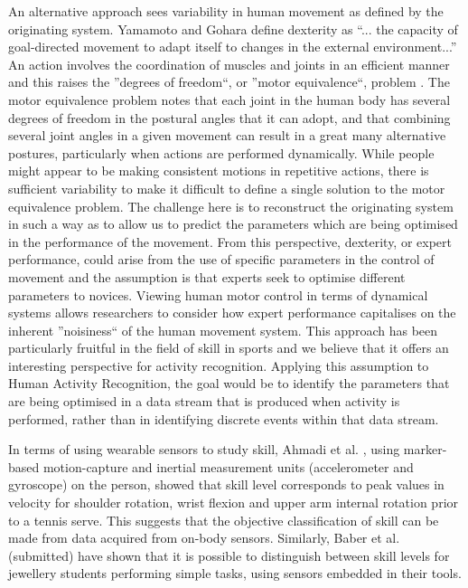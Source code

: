 \documentclass{sigchi}
\begin{document}
An alternative approach sees variability 
in human movement as defined by the originating system. Yamamoto and Gohara \cite{Yamamoto2000} 
define dexterity as ``... the capacity of goal-directed movement to adapt itself to changes in the external 
environment...”  An action involves the coordination of muscles and joints in an efficient manner 
and this raises the ''degrees of freedom``, or ''motor equivalence``, problem \cite{Bernstein1967}.
The motor equivalence problem notes that each joint in the human body has several degrees of freedom in 
the postural angles that it can adopt, and that combining several joint angles in a given movement can result 
in a great many alternative postures, particularly when actions are performed dynamically. While people might 
appear to be making consistent motions in repetitive actions, there is sufficient variability to make it 
difficult to define a single solution to the motor equivalence problem.  The challenge here is to reconstruct 
the originating system in such a way as to allow us to predict the parameters which are being optimised in the 
performance of the movement.  From this perspective, dexterity, or expert performance, could arise from the use 
of specific parameters in the control of movement and the assumption is that experts seek to optimise different 
parameters to novices.  Viewing human motor control in terms of dynamical systems allows researchers to consider 
how expert performance capitalises on the inherent ''noisiness`` of the human movement system.  This approach 
has been particularly fruitful in the field of skill in sports \cite{Davids2003} and we believe that it offers an 
interesting perspective for activity recognition. Applying this assumption to Human Activity Recognition, 
the goal would be to identify the parameters that are being optimised in a data stream that is produced
when activity is performed, rather than in identifying discrete events within that data stream.

In terms of using wearable sensors to study skill,  Ahmadi et al. \cite{Ahmadi2010}, using marker-based 
motion-capture and inertial measurement units (accelerometer and gyroscope) on the person,  showed that skill 
level corresponds to peak values in velocity for shoulder rotation, wrist flexion and upper arm internal 
rotation prior to a tennis serve.  This suggests that the objective classification of skill can be made from 
data acquired from on-body sensors.  Similarly, Baber et al. (submitted) have shown that it is possible to 
distinguish between skill levels for jewellery students performing simple tasks, using sensors embedded in their 
tools.
\end{document}
